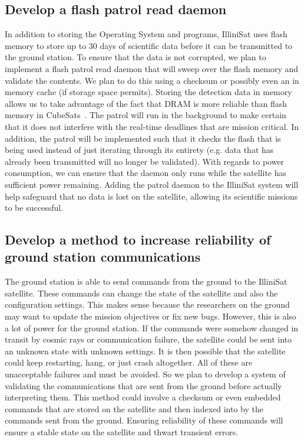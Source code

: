 \subsection{Develop a flash patrol read daemon}
In addition to storing the Operating System and programs, IlliniSat uses flash
memory to store up to 30 days of scientific data before it can be transmitted to
the ground station.  To ensure that the data is not corrupted, we plan to
implement a flash patrol read daemon that will sweep over the flash memory and
validate the contents. We plan to do this using a checksum or possibly even an
in memory cache (if storage space permits).  Storing the detection data in
memory allows us to take advantage of the fact that DRAM is more reliable than
flash memory in CubeSats~\cite{odegaard2013error}.  The patrol will run in the
background to make certain that it does not interfere with the real-time
deadlines that are mission critical.  In addition, the patrol will be
implemented such that it checks the flash that is being used instead of just
iterating through its entirety (e.g.  data that has already been transmitted
will no longer be validated). With regards to power consumption, we can ensure
that the daemon only runs while the satellite has sufficient power remaining.
Adding the patrol daemon to the IlliniSat system will help safeguard that no
data is lost on the satellite, allowing its scientific missions to be
successful.

\subsection{Develop a method to increase reliability of ground station
communications}
The ground station is able to send commands from the ground to the IlliniSat satellite. These commands
can change the state of the satellite and also the configuration settings. This makes sense because the
researchers on the ground may want to update the mission objectives or fix new bugs. However, this is
also a lot of power for the ground station. If the commands were somehow changed in transit by cosmic 
rays or communication failure, the satellite could be sent into an unknown state with unknown settings. 
It is then possible that the satellite could keep restarting, hang, or just crash altogether. All of these are
unacceptable failures and must be avoided. So we plan to develop a system of validating the 
communications that are sent from the ground before actually interpreting them. This method could 
involve a checksum or even embedded commands that are stored on the satellite and then indexed into
by the commands sent from the ground. Ensuring reliability of these commands will ensure a stable state
on the satellite and thwart transient errors.


